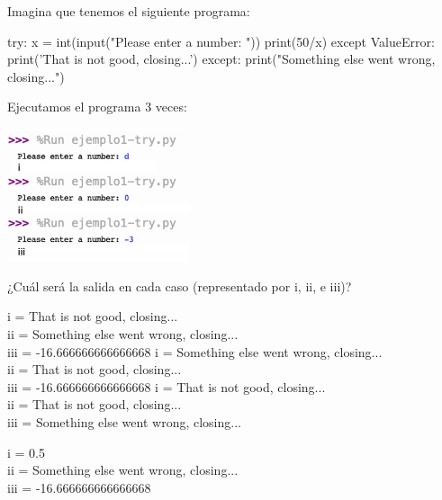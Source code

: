 \begin{ejercicio} Imagina que tenemos el siguiente programa:

\begin{python}
try:
    x = int(input("Please enter a number: "))
    print(50/x)
except ValueError:
    print('That is not good, closing...')
except:
    print("Something else went wrong, closing...")
\end{python}

Ejecutamos el programa 3 veces:

\includegraphics[width=0.4\textwidth]{book/Spanish/04_Bucles/images/exception-fig.png}

¿Cuál será la salida en cada caso (representado por i, ii, e iii)?

\begin{choices}
    \choice    %
    i =   That is not good, closing...\\ 
    ii =  Something else went wrong, closing...\\ 
    iii =  -16.666666666666668
    \choice 
    i =   Something else went wrong, closing...\\ 
    ii = That is not good, closing...\\ 
    iii =  -16.666666666666668
   \choice 
     i =  That is not good, closing...\\ 
    ii =  That is not good, closing...\\ 
    iii =  Something else went wrong, closing...
    
    \choice 
     i =  0.5\\ 
    ii =  Something else went wrong, closing...\\ 
    iii =  -16.666666666666668   
\end{choices}
\end{ejercicio}


